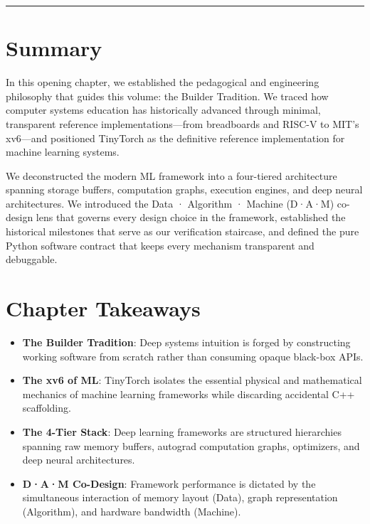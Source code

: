 \documentclass[
  letterpaper,
]{scrbook}
\providecommand{\tightlist}{%
  \setlength{\itemsep}{0pt}\setlength{\parskip}{0pt}}
\begin{document}
\begin{center}\rule{0.5\linewidth}{0.5pt}\end{center}

\section*{Summary}\label{summary}


In this opening chapter, we established the pedagogical and engineering
philosophy that guides this volume: the Builder Tradition. We traced how
computer systems education has historically advanced through minimal,
transparent reference implementations---from breadboards and RISC-V to
MIT's xv6---and positioned TinyTorch as the definitive reference
implementation for machine learning systems.

We deconstructed the modern ML framework into a four-tiered architecture
spanning storage buffers, computation graphs, execution engines, and
deep neural architectures. We introduced the Data · Algorithm · Machine
(D·A·M) co-design lens that governs every design choice in the
framework, established the historical milestones that serve as our
verification staircase, and defined the pure Python software contract
that keeps every mechanism transparent and debuggable.

\section*{Chapter Takeaways}\label{chapter-takeaways}


\begin{itemize}
\tightlist
\item
  \textbf{The Builder Tradition}: Deep systems intuition is forged by
  constructing working software from scratch rather than consuming
  opaque black-box APIs.
\item
  \textbf{The xv6 of ML}: TinyTorch isolates the essential physical and
  mathematical mechanics of machine learning frameworks while discarding
  accidental C++ scaffolding.
\item
  \textbf{The 4-Tier Stack}: Deep learning frameworks are structured
  hierarchies spanning raw memory buffers, autograd computation graphs,
  optimizers, and deep neural architectures.
\item
  \textbf{D·A·M Co-Design}: Framework performance is dictated by the
  simultaneous interaction of memory layout (Data), graph representation
  (Algorithm), and hardware bandwidth (Machine).
\end{itemize}
\end{document}
